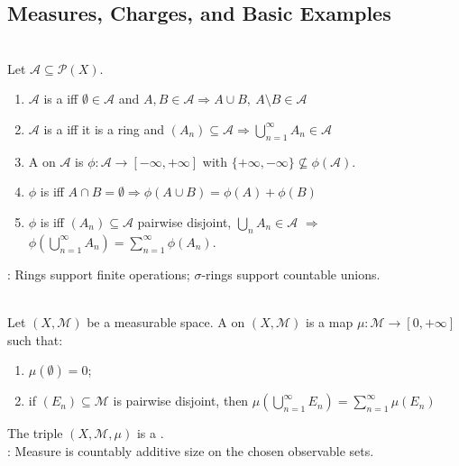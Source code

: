 \subsection{Measures, Charges, and Basic Examples}

\begin{definition} \label{def:measure-measurability-core-source-todo}\label{def:ring-sigma-ring-set-function} \\
Let $\mathcal{A}\subseteq\mathcal{P}(X)$.
\begin{enumerate}[label=(\roman*)]
\setlength{\itemsep}{0pt}
\item $\mathcal{A}$ is a  iff $\emptyset\in\mathcal{A}$ and $A,B\in\mathcal{A}\Rightarrow A\cup B,\ A\setminus B\in\mathcal{A}$
\item $\mathcal{A}$ is a  iff it is a ring and $(A_n)\subseteq\mathcal{A}\Rightarrow\bigcup_{n=1}^{\infty}A_n\in\mathcal{A}$
\item A  on $\mathcal{A}$ is $\phi:\mathcal{A}\to[-\infty,+\infty]$ with $\{+\infty,-\infty\}\nsubseteq\phi(\mathcal{A})$.
\item $\phi$ is  iff $A\cap B=\emptyset\Rightarrow\phi(A\cup B)=\phi(A)+\phi(B)$
\item $\phi$ is  iff $(A_n)\subseteq\mathcal{A}$ pairwise disjoint, $\bigcup_nA_n\in\mathcal{A}$ $\Rightarrow$ $\phi\left(\bigcup_{n=1}^{\infty}A_n\right)=\sum_{n=1}^{\infty}\phi(A_n)$.
\end{enumerate}
: Rings support finite operations; $\sigma$-rings support countable unions.
\end{definition}

\begin{definition} \label{def:abstract-measure-on-measurable-space} \\
Let $(X,\mathcal{M})$ be a measurable space. A  on $(X,\mathcal{M})$ is a map $\mu:\mathcal{M}\to[0,+\infty]$ such that:
\begin{enumerate}[label=(\roman*)]
\setlength{\itemsep}{0pt}
\item $\mu(\emptyset)=0$;
\item if $(E_n)\subseteq\mathcal{M}$ is pairwise disjoint, then $\mu\left(\bigcup_{n=1}^{\infty}E_n\right)=\sum_{n=1}^{\infty}\mu(E_n)$
\end{enumerate}
The triple $(X,\mathcal{M},\mu)$ is a .\\
: Measure is countably additive size on the chosen observable sets.
\end{definition}

